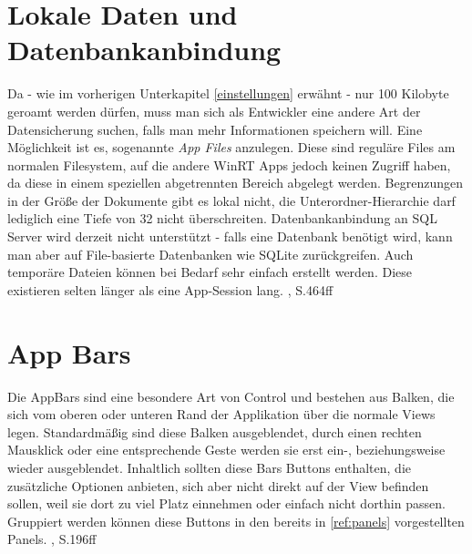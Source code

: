\documentclass[a4paper,bibtotoc,oneside]{scrbook}
\begin{document}
\section[Lokale Daten und Datenbankanbindung]{Lokale Daten und Datenbankanbindung}
Da - wie im vorherigen Unterkapitel \ref{einstellungen} erwähnt - nur 100 Kilobyte geroamt werden dürfen, muss man sich als Entwickler eine andere Art der Datensicherung suchen, falls man mehr Informationen speichern will.
\newline
Eine Möglichkeit ist es, sogenannte \textit{App Files} anzulegen. Diese sind reguläre Files am normalen Filesystem, auf die andere WinRT Apps jedoch keinen Zugriff haben, da diese in einem speziellen abgetrennten Bereich abgelegt werden. Begrenzungen in der Größe der Dokumente gibt es lokal nicht, die Unterordner-Hierarchie darf lediglich eine Tiefe von 32 nicht überschreiten.
\newline
\newline
Datenbankanbindung an SQL Server wird derzeit nicht unterstützt - falls eine Datenbank benötigt wird, kann man aber auf File-basierte Datenbanken wie SQLite zurückgreifen.
\newline
\newline
Auch temporäre Dateien können bei Bedarf sehr einfach erstellt werden. Diese existieren selten länger als eine App-Session lang.
\cite{ana12}, S.464ff


\section[App Bars]{App Bars}
Die AppBars sind eine besondere Art von Control und bestehen aus Balken, die sich vom oberen oder unteren Rand der Applikation über die normale Views legen. Standardmäßig sind diese Balken ausgeblendet, durch einen rechten Mausklick oder eine entsprechende Geste werden sie erst ein-, beziehungsweise wieder ausgeblendet. Inhaltlich sollten diese Bars Buttons enthalten, die zusätzliche Optionen anbieten, sich aber nicht direkt auf der View befinden sollen, weil sie dort zu viel Platz einnehmen oder einfach nicht dorthin passen. Gruppiert werden können diese Buttons in den bereits in \ref{ref:panels} vorgestellten Panels.
\cite{ana12}, S.196ff
\end{document}
